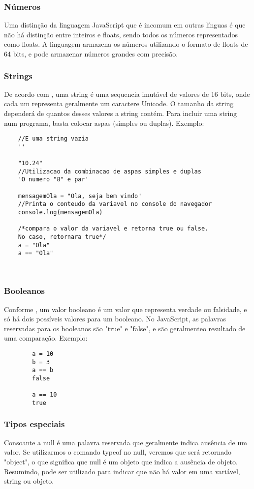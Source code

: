 	\subsubsection{Números}
	Uma distinção da linguagem JavaScript que é incomum em outras línguas é que não há distinção entre inteiros e floats, sendo todos os números representados como floats. 
	A linguagem armazena os números utilizando o formato de floats de 64 bits, e pode armazenar números grandes com precisão.
	
	\subsubsection{Strings}
	De acordo com \cite{flanagan2020javascript}, uma string é uma sequencia imutável de valores de 16 bits, onde cada um representa geralmente um caractere Unicode. O tamanho da string dependerá de quantos desses valores a string contém. Para incluir uma string num programa, basta colocar aspas (simples ou duplas). Exemplo:
	
	\begin{lstlisting}
	//E uma string vazia
	''
	
	"10.24"	
	//Utilizacao da combinacao de aspas simples e duplas
	'O numero "8" e par'				
	
	mensagemOla = "Ola, seja bem vindo" 
	//Printa o conteudo da variavel no console do navegador
	console.log(mensagemOla)	
	
	/*compara o valor da variavel e retorna true ou false. 
	No caso, retornara true*/
	a = "Ola"
	a == "Ola"
	
	
	\end{lstlisting}
	
	\subsubsection{Booleanos}
	Conforme \cite{powers2015javascript}, um valor booleano é um valor que representa verdade ou falsidade, e só há dois possíveis valores para um booleano. No JavaScript, as palavras reservadas para os booleanos são "true" e "false", e são geralmenteo resultado de uma comparação. Exemplo:
	
	\begin{lstlisting}
		a = 10
		b = 3
		a == b
		false
		
		a == 10
		true
	\end{lstlisting}
	\subsubsection{Tipos especiais}
	Consoante a \cite{flanagan2020javascript} null é uma palavra reservada que geralmente indica ausência de um valor. Se utilizarmos o comando typeof no null, veremos que será retornado "object", o que significa que null é um objeto que indica a ausência de objeto. Resumindo, pode ser utilizado para indicar que não há valor em uma variável, string ou objeto. 
	
